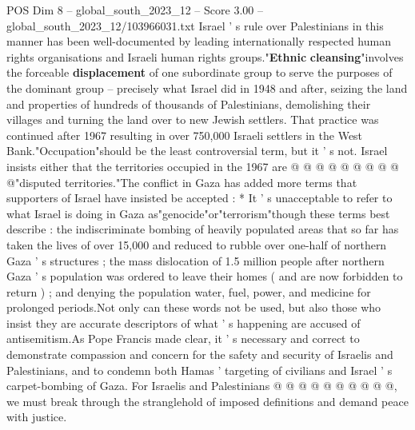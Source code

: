 \begin{textsample}{POS Dim 8 – global\_south\_2023\_12 – Score 3.00 – global\_south\_2023\_12/103966031.txt}
Israel ' s rule over Palestinians in this manner has been well-documented by leading internationally respected human rights organisations and Israeli human rights groups."\textbf{Ethnic} \textbf{cleansing}"involves the forceable \textbf{displacement} of one subordinate group to serve the purposes of the dominant group -- precisely what Israel did in 1948 and after, seizing the land and properties of hundreds of thousands of Palestinians, demolishing their villages and turning the land over to new Jewish settlers.
That practice was continued after 1967 resulting in over 750,000 Israeli settlers in the West Bank."Occupation"should be the least controversial term, but it ' s not.
Israel insists either that the territories occupied in the 1967 are @ @ @ @ @ @ @ @ @ @"disputed territories."The conflict in Gaza has added more terms that supporters of Israel have insisted be accepted : * It ' s unacceptable to refer to what Israel is doing in Gaza as"genocide"or"terrorism"though these terms best describe : the indiscriminate bombing of heavily populated areas that so far has taken the lives of over 15,000 and reduced to rubble over one-half of northern Gaza ' s structures ; the mass dislocation of 1.5 million people after northern Gaza ' s population was ordered to leave their homes ( and are now forbidden to return ) ; and denying the population water, fuel, power, and medicine for prolonged periods.Not only can these words not be used, but also those who insist they are accurate descriptors of what ' s happening are accused of antisemitism.As Pope Francis made clear, it ' s necessary and correct to demonstrate compassion and concern for the safety and security of Israelis and Palestinians, and to condemn both Hamas ' targeting of civilians and Israel ' s carpet-bombing of Gaza.
For Israelis and Palestinians @ @ @ @ @ @ @ @ @ @, we must break through the stranglehold of imposed definitions and demand peace with justice.

\end{textsample}
